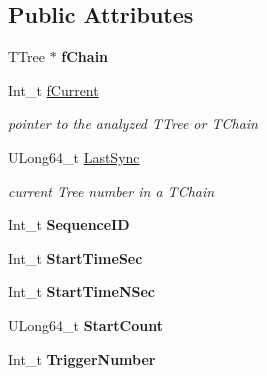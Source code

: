 \subsection*{Public Attributes}
\begin{DoxyCompactItemize}
\item 
\hypertarget{classPMTData_ab6f5a263a14b5dd5f6e35ca1df4ca7f2}{
TTree $\ast$ {\bfseries fChain}}
\label{classPMTData_ab6f5a263a14b5dd5f6e35ca1df4ca7f2}

\item 
\hypertarget{classPMTData_a7745fca9e7cc842de4b0b57407b77f88}{
Int\_\-t \hyperlink{classPMTData_a7745fca9e7cc842de4b0b57407b77f88}{fCurrent}}
\label{classPMTData_a7745fca9e7cc842de4b0b57407b77f88}

\begin{DoxyCompactList}\small\item\em pointer to the analyzed TTree or TChain \item\end{DoxyCompactList}\item 
\hypertarget{classPMTData_aca229b56ff1777b30c95f5325cc55292}{
ULong64\_\-t \hyperlink{classPMTData_aca229b56ff1777b30c95f5325cc55292}{LastSync}}
\label{classPMTData_aca229b56ff1777b30c95f5325cc55292}

\begin{DoxyCompactList}\small\item\em current Tree number in a TChain \item\end{DoxyCompactList}\item 
\hypertarget{classPMTData_a5c6be7f17efe083ea5a5df3921ddef80}{
Int\_\-t {\bfseries SequenceID}}
\label{classPMTData_a5c6be7f17efe083ea5a5df3921ddef80}

\item 
\hypertarget{classPMTData_a4c0df523145834151778799e8f3fa223}{
Int\_\-t {\bfseries StartTimeSec}}
\label{classPMTData_a4c0df523145834151778799e8f3fa223}

\item 
\hypertarget{classPMTData_aa2983c2163daa5b6460706e00d5f9097}{
Int\_\-t {\bfseries StartTimeNSec}}
\label{classPMTData_aa2983c2163daa5b6460706e00d5f9097}

\item 
\hypertarget{classPMTData_a6aff50e9830483d158ec19db4e739144}{
ULong64\_\-t {\bfseries StartCount}}
\label{classPMTData_a6aff50e9830483d158ec19db4e739144}

\item 
\hypertarget{classPMTData_a7731940755b54f0aaa070918452f9808}{
Int\_\-t {\bfseries TriggerNumber}}
\label{classPMTData_a7731940755b54f0aaa070918452f9808}


\end{DoxyCompactItemize}
